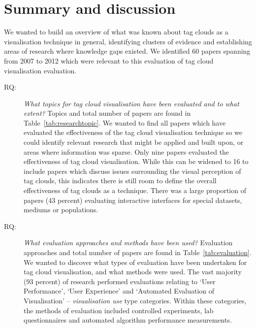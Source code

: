 \section{Summary and discussion}\label{sect:mappingdiscussion}

We wanted to build an overview of what was known about tag clouds as a visualisation technique in general, identifying clusters of evidence and establishing areas of research where knowledge gaps existed. We identified 60 papers spanning from 2007 to 2012 which were relevant to this evaluation of tag cloud visualisation evaluation. 

\begin{description}

\item[RQ:] \textit{What topics for tag cloud visualisation have been evaluated and to what extent?} Topics and total number of papers are found in Table~\vref{tab:researchtopic}. We wanted to find all papers which have evaluated the effectiveness of the tag cloud visualisation technique  so we could identify relevant research that might be applied and built upon, or areas where information was sparse. Only nine papers evaluated the effectiveness of tag cloud visualisation. While this can be widened to 16 to include papers which discuss issues surrounding the visual perception of tag clouds, this indicates there is still room to define the overall effectiveness of tag clouds as a technique. There was a large proportion of papers (43 percent) evaluating interactive interfaces for special datasets, mediums or populations. 

\item[RQ:] \textit{What evaluation approaches and methods have been used?} Evaluation approaches and total number of papers are found in Table~\vref{tab:evaluation}. We wanted to discover what types of evaluation have been undertaken for tag cloud visualisation, and what methods were used. The vast majority (93 percent) of research performed evaluations relating to `User Performance', `User Experience' and `Automated Evaluation of Visualisation' -- \emph{visualisation use} type categories. Within these categories, the methods of evaluation included controlled experiments, lab questionnaires and automated algorithm performance measurements.


\end{description}

